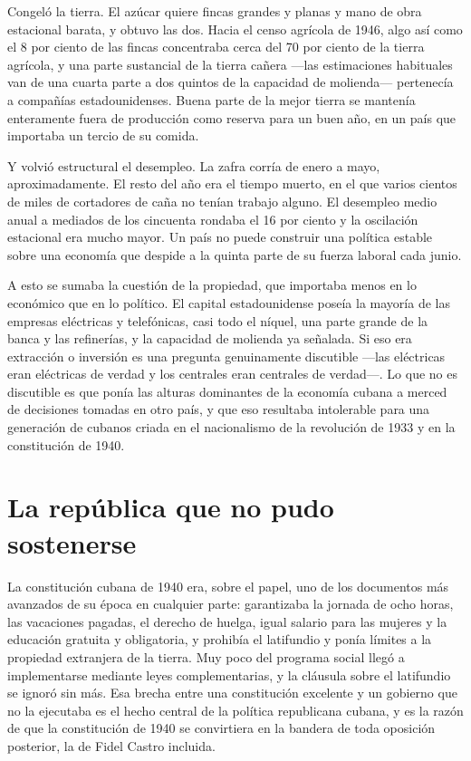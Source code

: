 Congeló la tierra. El azúcar quiere fincas grandes y planas y mano de obra
estacional barata, y obtuvo las dos. Hacia el censo agrícola de 1946, algo así
como el 8 por ciento de las fincas concentraba cerca del 70 por ciento de la
tierra agrícola, y una parte sustancial de la tierra cañera ---las estimaciones
habituales van de una cuarta parte a dos quintos de la capacidad de molienda---
pertenecía a compañías estadounidenses.\unv{} Buena parte de la mejor tierra se
mantenía enteramente fuera de producción como reserva para un buen año, en un
país que importaba un tercio de su comida.

Y volvió estructural el desempleo. La zafra corría de enero a mayo,
aproximadamente. El resto del año era el tiempo muerto, en el que varios cientos
de miles de cortadores de caña no tenían trabajo alguno. El desempleo medio anual
a mediados de los cincuenta rondaba el 16 por ciento y la oscilación estacional
era mucho mayor.\unv{} Un país no puede construir una política estable sobre una
economía que despide a la quinta parte de su fuerza laboral cada junio.

A esto se sumaba la cuestión de la propiedad, que importaba menos en lo económico
que en lo político. El capital estadounidense poseía la mayoría de las empresas
eléctricas y telefónicas, casi todo el níquel, una parte grande de la banca y las
refinerías, y la capacidad de molienda ya señalada. Si eso era extracción o
inversión es una pregunta genuinamente discutible ---las eléctricas eran
eléctricas de verdad y los centrales eran centrales de verdad---. Lo que no es
discutible es que ponía las alturas dominantes de la economía cubana a merced de
decisiones tomadas en otro país, y que eso resultaba intolerable para una
generación de cubanos criada en el nacionalismo de la revolución de 1933 y en la
constitución de 1940.

\section{La república que no pudo sostenerse}

La constitución cubana de 1940 era, sobre el papel, uno de los documentos más
avanzados de su época en cualquier parte: garantizaba la jornada de ocho horas,
las vacaciones pagadas, el derecho de huelga, igual salario para las mujeres y la
educación gratuita y obligatoria, y prohibía el latifundio y ponía límites a la
propiedad extranjera de la tierra. Muy poco del programa social llegó a
implementarse mediante leyes complementarias, y la cláusula sobre el latifundio
se ignoró sin más. Esa brecha entre una constitución excelente y un gobierno que
no la ejecutaba es el hecho central de la política republicana cubana, y es la
razón de que la constitución de 1940 se convirtiera en la bandera de toda
oposición posterior, la de Fidel Castro incluida.

